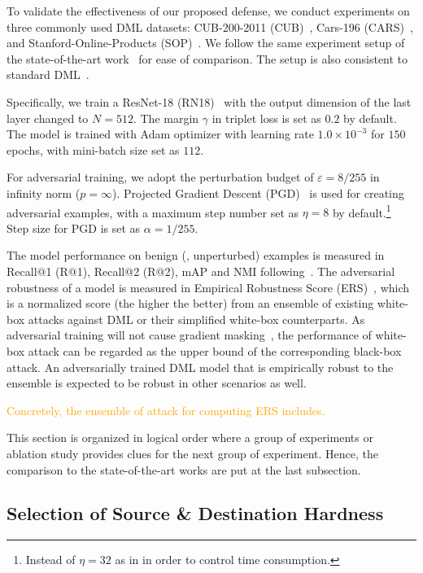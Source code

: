 \documentclass[10pt,twocolumn,letterpaper]{article}
\newcommand{\oo}[1]{\textcolor{orange}{#1}}
\begin{document}
To validate the effectiveness of our proposed defense, we conduct experiments
on three commonly used DML datasets: CUB-200-2011 (CUB)~\cite{cub200}, Cars-196
(CARS)~\cite{cars196}, and Stanford-Online-Products (SOP)~\cite{sop}.
%
We follow the same experiment setup of the state-of-the-art work~\cite{robrank}
for ease of comparison.
%
The setup is also consistent to standard DML~\cite{revisiting}.

Specifically, we train a ResNet-18 (RN18)~\cite{resnet} with the output dimension of
the last layer changed to $N=512$.
%
The margin $\gamma$ in triplet loss is set as $0.2$ by default.
%
The model is trained with Adam optimizer with learning rate $1.0\times 10^{-3}$
for $150$ epochs, with mini-batch size set as $112$.

For adversarial training, we adopt the perturbation budget of
$\varepsilon=8/255$ in infinity norm ($p=\infty$).
%
Projected Gradient Descent (PGD)~\cite{madry} is used for creating adversarial
examples, with a maximum step number set as $\eta=8$ by default.\footnote{
Instead of $\eta=32$ as in \cite{robrank} in order to control time consumption.}
%
Step size for PGD is set as $\alpha=1/255$.

The model performance on benign (\ie, unperturbed) examples is measured in
Recall@1 (R@1), Recall@2 (R@2), mAP and NMI
following~\cite{revisiting,robrank}.
%
The adversarial robustness of a model is measured in Empirical Robustness Score
(ERS)~\cite{robrank}, which is a normalized score (the higher the better) from
an ensemble of existing white-box attacks against DML or their simplified
white-box counterparts.
%
As adversarial training will not cause gradient masking~\cite{obfuscated},
the performance of white-box attack can be regarded as the upper bound of the
corresponding black-box attack.
%
An adversarially trained DML model that is empirically robust to the ensemble
is expected to be robust in other scenarios as well.

\oo{Concretely, the ensemble of attack for computing ERS includes.}

This section is organized in logical order where a group of experiments
or ablation study
provides clues for the next group of experiment.
%
Hence, the comparison to the state-of-the-art works are put at the last
subsection.

\subsection{Selection of Source \& Destination Hardness}
\label{sec:41}
\end{document}
